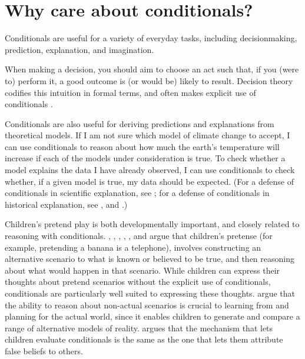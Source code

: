 \section{Why care about conditionals?}

Conditionals are useful for a variety of everyday tasks, including decisionmaking, prediction, explanation, and imagination.

When making a decision, you should aim to choose an act such that, if you (were to) perform it, a good outcome is (or would be) likely to result.  Decision theory codifies this intuition in formal terms, and often makes explicit use of conditionals   \citep{gibbard-harper, vinci-decision, bradley-conditionals, Cantwell2013-CANCIC}.

Conditionals are also useful for deriving predictions and explanations from theoretical models.  If I am not sure which model of climate change to accept, I can use conditionals to reason about how much the earth's temperature will increase if each of the models under consideration is true.  To check whether a model explains the data I have already observed, I can use conditionals to check whether, if a given model is true, my data should be expected.  (For a defense of conditionals in scientific explanation, see \citealp{Woodward2004-WOOCAC}; for a defense of conditionals in historical explanation, see \citealp{Reiss2009-REICTE}, and \citealp{Nolan2013-NOLWHA}.)

Children's pretend play is both developmentally important, and closely related to reasoning with conditionals.  \citet{amsel-smalley}, \citet{dias-harris}, \citet{gopnik-phil-baby}, \citet{harris-imagination}, \citet{lillard-pretend}, and \citet{walton-mimesis} argue that children's pretense (for example, pretending a banana is a telephone), involves constructing an alternative scenario to what is known or believed to be true, and then reasoning about what would happen in that scenario.  While children can express their thoughts about pretend scenarios without the explicit use of conditionals, conditionals are particularly well suited to expressing these thoughts.  \citet{weisberg-gopnik} argue that the ability to reason about non-actual scenarios is crucial to learning from and planning for the actual world, since it enables children to generate and compare a range of alternative models of reality.  \citet{kryzyzanowska} argues that the mechanism that lets children evaluate conditionals is the same as the one that lets them attribute false beliefs to others.

